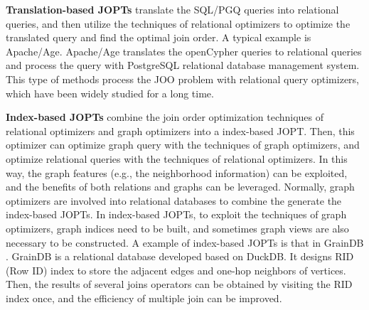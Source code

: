 \documentclass[sigconf, nonacm]{acmart}
\begin{document}

\textbf{Translation-based JOPTs} translate the SQL/PGQ queries into relational queries, and then utilize the techniques of relational optimizers to optimize the translated query and find the optimal join order. 
A typical example is Apache/Age. 
Apache/Age translates the openCypher queries to relational queries and process the query with PostgreSQL relational database management system.
This type of methods process the JOO problem with relational query optimizers, which have been widely studied for a long time.

\textbf{Index-based JOPTs} combine the join order optimization techniques of relational optimizers and graph optimizers into a index-based JOPT.
Then, this optimizer can optimize graph query with the techniques of graph optimizers, and optimize relational queries with the techniques of relational optimizers.
In this way, the graph features (e.g., the neighborhood information) can be exploited, and the benefits of both relations and graphs can be leveraged. 
Normally, graph optimizers are involved into relational databases to combine the generate the index-based JOPTs.
In index-based JOPTs, to exploit the techniques of graph optimizers, graph indices need to be built, and sometimes graph views are also necessary to be constructed. 
A example of index-based JOPTs is that in GrainDB \cite{graindb}.
GrainDB is a relational database developed based on DuckDB.
It designs RID (Row ID) index to store the adjacent edges and one-hop neighbors of vertices.
Then, the results of several joins operators can be obtained by visiting the RID index once, and the efficiency of multiple join can be improved.
\end{document}
